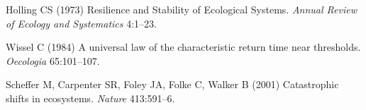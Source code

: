 \documentclass{pnastwo}
\begin{document}
\begin{article}




\begin{thebibliography}{10}

Holling CS
\newblock (1973) {Resilience and Stability of Ecological Systems}.
\newblock \emph{Annual Review of Ecology and Systematics} 4:1--23.

Wissel C
\newblock (1984) {A universal law of the characteristic return time near
  thresholds}.
\newblock \emph{Oecologia} 65:101--107.

Scheffer M, Carpenter SR, Foley JA, Folke C, Walker B
\newblock (2001) {Catastrophic shifts in ecosystems.}
\newblock \emph{Nature} 413:591--6.


\end{thebibliography}
\end{article}
\end{document}
